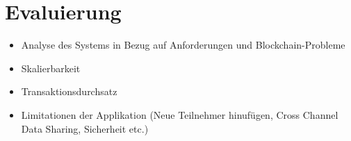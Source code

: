 \section{Evaluierung}
\begin{itemize}
    \item Analyse des Systems in Bezug auf Anforderungen und Blockchain-Probleme
    \item Skalierbarkeit
    \item Transaktionsdurchsatz
    \item Limitationen der Applikation (Neue Teilnehmer hinufügen, Cross Channel Data Sharing, Sicherheit etc.)
\end{itemize}



